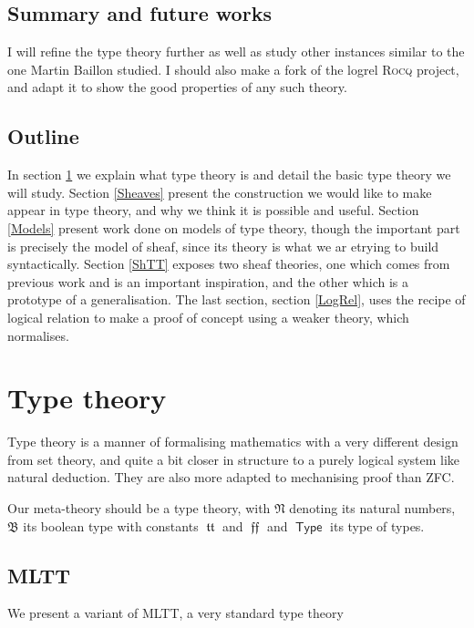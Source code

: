 \documentclass[11pt]{article}
\DeclareMathOperator{\Type}{\mathsf{Type}}
\DeclareMathOperator{\mtrue}{\mathfrak{tt}}
\DeclareMathOperator{\mfalse}{\mathfrak{ff}}
\newcommand{\0}{\mathbf{0}}
\newcommand{\1}{\mathbf{1}}
\newcommand{\mnat}{\mathfrak{N}}
\newcommand{\mbool}{\mathfrak{B}}
\begin{document}
\subsection*{Summary and future works}
I will refine the type theory further as well as study other instances similar to the one Martin Baillon studied.
I should also make a fork of the logrel \textsc{Rocq} project, and adapt it to show the good properties of any such theory.
\newpage
\tableofcontents
\newpage



\subsection*{Outline}

In section \ref{TT} we explain what type theory is and detail the basic type theory we will study. Section \ref{Sheaves} present the construction we would like to make appear in type theory, and why we think it is possible and useful. Section \ref{Models} present work done on models of type theory, though the important part is precisely the model of sheaf, since its theory is what we ar etrying to build syntactically. Section \ref{ShTT} exposes two sheaf theories, one which comes from previous work and is an important inspiration, and the other which is a prototype of a generalisation. The last section, section \ref{LogRel}, uses the recipe of logical relation to make a proof of concept using a weaker theory, which normalises.

\section{Type theory}\label{TT}

Type theory is a manner of formalising mathematics with a very different design from set theory, and quite a bit closer in structure to a purely logical system like natural deduction. They are also more adapted to mechanising proof than ZFC.

Our meta-theory should be a type theory, with $\mnat$ denoting its natural numbers, $\mbool$ its boolean type with constants $\mtrue$ and $\mfalse$ and $\Type$ its type of types.

\subsection{MLTT}
We present a variant of MLTT, a very standard type theory
\end{document}
